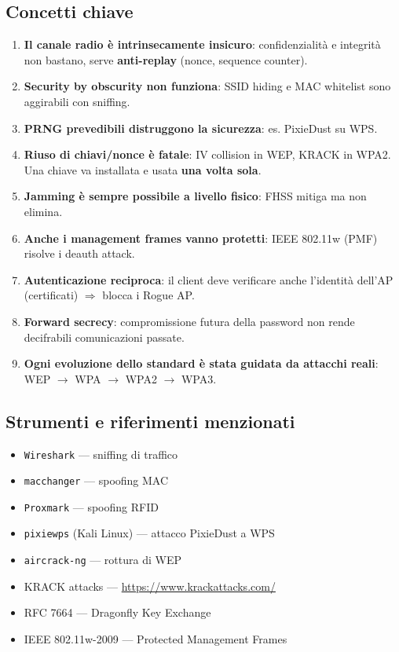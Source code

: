 \subsection{Concetti chiave}

\begin{enumerate}
  \item \textbf{Il canale radio \`e intrinsecamente insicuro}: confidenzialit\`a e integrit\`a non bastano, serve \textbf{anti-replay} (nonce, sequence counter).
  \item \textbf{Security by obscurity non funziona}: SSID hiding e MAC whitelist sono aggirabili con sniffing.
  \item \textbf{PRNG prevedibili distruggono la sicurezza}: es. PixieDust su WPS.
  \item \textbf{Riuso di chiavi/nonce \`e fatale}: IV collision in WEP, KRACK in WPA2. Una chiave va installata e usata \textbf{una volta sola}.
  \item \textbf{Jamming \`e sempre possibile a livello fisico}: FHSS mitiga ma non elimina.
  \item \textbf{Anche i management frames vanno protetti}: IEEE 802.11w (PMF) risolve i deauth attack.
  \item \textbf{Autenticazione reciproca}: il client deve verificare anche l'identit\`a dell'AP (certificati) $\Rightarrow$ blocca i Rogue AP.
  \item \textbf{Forward secrecy}: compromissione futura della password non rende decifrabili comunicazioni passate.
  \item \textbf{Ogni evoluzione dello standard \`e stata guidata da attacchi reali}: WEP $\to$ WPA $\to$ WPA2 $\to$ WPA3.
\end{enumerate}

\subsection{Strumenti e riferimenti menzionati}

\begin{itemize}
  \item \texttt{Wireshark} --- sniffing di traffico
  \item \texttt{macchanger} --- spoofing MAC
  \item \texttt{Proxmark} --- spoofing RFID
  \item \texttt{pixiewps} (Kali Linux) --- attacco PixieDust a WPS
  \item \texttt{aircrack-ng} --- rottura di WEP
  \item KRACK attacks --- \url{https://www.krackattacks.com/}
  \item RFC 7664 --- Dragonfly Key Exchange
  \item IEEE 802.11w-2009 --- Protected Management Frames
\end{itemize}

% 
